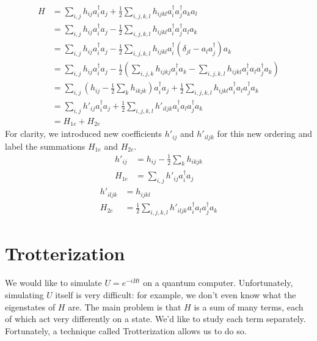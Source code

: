 \begin{equation}
    \begin{split}
        H &= \sum_{i, j} h_{ij}a^\dag_ia_j + \frac{1}{2}\sum_{i,j,k,l} h_{ijkl}a^\dag_ia^\dag_ja_ka_l \\
        &= \sum_{i, j} h_{ij}a^\dag_ia_j - \frac{1}{2}\sum_{i,j,k,l} h_{ijkl}a^\dag_ia^\dag_ja_la_k \\
        &= \sum_{i, j} h_{ij}a^\dag_ia_j - \frac{1}{2}\sum_{i,j,k,l} h_{ijkl}a^\dag_i(\delta_{jl} - a_la^\dag_j)a_k \\
        &= \sum_{i, j} h_{ij}a^\dag_ia_j - \frac{1}{2}\left(\sum_{i, j, k}h_{ijkj}a^\dag_ia_k - \sum_{i,j,k,l} h_{ijkl}a^\dag_ia_la^\dag_ja_k\right) \\
        &= \sum_{i, j} (h_{ij} - \frac{1}{2}\sum_k h_{ikjk})a^\dag_ia_j + \frac{1}{2}\sum_{i,j,k,l} h_{ijkl}a^\dag_ia_la^\dag_ja_k \\
        &= \sum_{i, j} h'_{ij}a^\dag_ia_j + \frac{1}{2}\sum_{i,j,k,l} h'_{iljk}a^\dag_ia_la^\dag_ja_k \\
        &= H_{1e} + H_{2e}
    \end{split}
    \label{eq: H3}
\end{equation}
For clarity, we introduced new coefficients $h'_{ij}$ and $h'_{iljk}$ for this new ordering and label the summations $H_{1e}$ and $H_{2e}$.
\begin{equation}
    \begin{split}
        h'_{ij} &= h_{ij} - \frac{1}{2}\sum_k h_{ikjk} \\
        H_{1e} &= \sum_{i, j} h'_{ij}a^\dag_ia_j \label{eq: H1}
    \end{split}
\end{equation}
\begin{equation}
    \begin{split}
        h'_{iljk} &= h_{ijkl} \\
        H_{2e} &= \frac{1}{2}\sum_{i,j,k,l} h'_{iljk}a^\dag_ia_la^\dag_ja_k \label{eq: H2}
    \end{split}
\end{equation}

\section{Trotterization}

We would like to simulate $U = e^{-iHt}$ on a quantum computer. Unfortunately, simulating $U$ itself is very difficult: for example, we don't even know what the eigenstates of $H$ are. The main problem is that $H$ is a sum of many terms, each of which act very differently on a state. We'd like to study each term separately. Fortunately, a technique called Trotterization allows us to do so.

